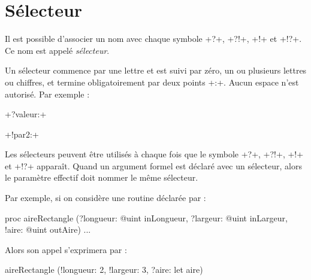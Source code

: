 








\section{Sélecteur}

Il est possible d'associer un nom avec chaque symbole \ggs+?+, \ggs+?!+, \ggs+!+ et \ggs+!?+. Ce nom est appelé \emph{sélecteur}.

Un sélecteur commence par une lettre et est suivi par zéro, un ou plusieurs lettres ou chiffres, et termine obligatoirement par deux points \ggs+:+. Aucun espace n'est autorisé. Par exemple :

\ggs+?valeur:+

\ggs+!par2:+

Les sélecteurs peuvent être utilisés à chaque fois que le symbole \ggs+?+, \ggs+?!+, \ggs+!+ et \ggs+!?+ apparaît. Quand un argument formel est déclaré avec un sélecteur, alors le paramètre effectif doit nommer le même sélecteur.

Par exemple, si on considère une routine déclarée par :

\begin{galgas}
proc aireRectangle (?longueur: @uint inLongueur,
                    ?largeur: @uint inLargeur,
                    !aire: @uint outAire) {
  ...
}
\end{galgas}

Alors son appel s'exprimera par :
\begin{galgas}
  aireRectangle (!longueur: 2, !largeur: 3, ?aire: let aire) 
\end{galgas}


